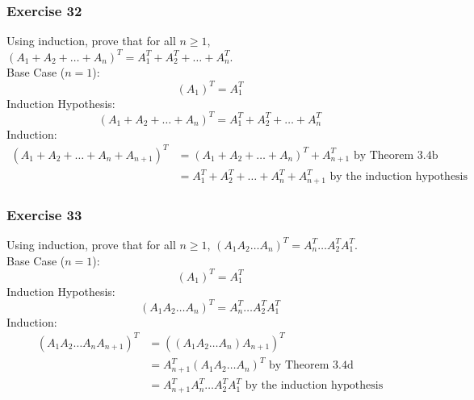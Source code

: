 \documentclass{math}
\begin{document}
\subsubsection*{Exercise 32}
Using induction, prove that for all \( n\ge1 \), \( (A_1+A_2+\dots+A_n)^T =
A_1^T+A_2^T+\dots+A_n^T \). \\
Base Case (\( n = 1 \)):
\[ (A_1)^T = A_1^T \]
Induction Hypothesis:
\[ (A_1+A_2+\dots+A_n)^T = A_1^T+A_2^T+\dots+A_n^T \]
Induction:
\begin{align*}
  (A_1+A_2+\dots+A_n+A_{n+1})^T &= (A_1+A_2+\dots+A_n)^T+A_{n+1}^T
    \text{ by Theorem 3.4b} \\
  &= A_1^T+A_2^T+\dots+A_n^T+A_{n+1}^T \text{ by the induction hypothesis}
\end{align*}

\subsubsection*{Exercise 33}
Using induction, prove that for all \( n\ge1 \), \( (A_1A_2\dots A_n)^T =
A_n^T\dots A_2^TA_1^T \). \\
Base Case (\( n = 1 \)):
\[ (A_1)^T = A_1^T \]
Induction Hypothesis:
\[ (A_1A_2\dots A_n)^T = A_n^T\dots A_2^TA_1^T \]
Induction:
\begin{align*}
  (A_1A_2\dots A_nA_{n+1})^T &= ((A_1A_2\dots A_n)A_{n+1})^T \\
  &= A_{n+1}^T(A_1A_2\dots A_n)^T \text{ by Theorem 3.4d} \\
  &= A_{n+1}^TA_n^T\dots A_2^TA_1^T \text{ by the induction hypothesis}
\end{align*}
\end{document}
